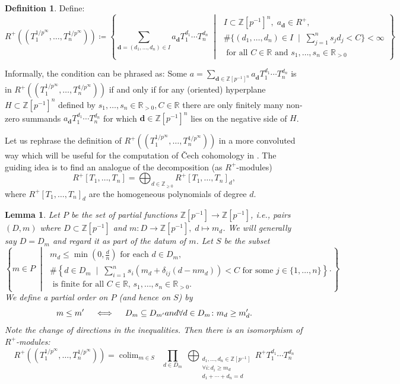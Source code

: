 \documentclass[10pt,twoside]{article}
\numberwithin{equation}{section}
\theoremstyle{plain}
\newtheorem{mylemma}[mythm]{Lemma}
\theoremstyle{definition}
\newtheorem{mydef}[mythm]{Definition}
\DeclareMathOperator*{\colim}{colim}
\newcommand{\ZZ}{\mathbb{Z}}
\newcommand{\RR}{\mathbb{R}}
\newcommand{\Cech}{\v{C}ech }
\newcommand{\pRoots}{{1/p^\infty}}
\newcommand{\ZZip}{\ZZ[p^{-1}]}
\newcommand{\ZZgez}{\ZZ_{\geq 0}}
\begin{document}
\begin{mydef}\cite[Definition 2.4]{Kim}\label{KimExtLaurentDef}
    Define:
    \[R^+((T_1^{\pRoots},\dots, T_n^{\pRoots}))\coloneqq
    \left\{
    \sum_{\mathbf{d}=(d_1,\dots,d_n)\in I}a_{\mathbf{d}}^{}T_1^{d_1}\cdots T_n^{d_n}
    \;\middle|\;
    \substack{I\subset \ZZ[p^{-1}]^n, \; a_{\mathbf{d}}\in R^+, \\
    \#\{(d_1,\dots,d_n)\in I \;\mid\; \sum_{j=1}^n s_jd_j<C\}<\infty \\
    \text{  for all \(C\in \RR\) and \(s_1,\dots,s_n\in \RR_{>0}\)}
    }
    \right\}\]
\end{mydef}
Informally, the condition can be phrased as: Some \(a=\sum_{\mathbf{d}\in \ZZip^n}a_{\mathbf{d}}^{}T_1^{d_1}\cdots T_n^{d_n}\) is in \(R^+((T_1^{\pRoots},\dots, T_n^{\pRoots}))\) if and only if for any (oriented)
hyperplane \(H\subset \ZZip^n\) defined by \(s_1,\dots,s_n\in \RR_{>0},C\in \RR\) there are only finitely many non-zero summands \(a_{\mathbf{d}}^{}T_1^{d_1}\cdots T_n^{d_n}\) for which \(\mathbf d\in \ZZip^n\) lies on the negative side of \(H\).\par

Let us rephrase the definition of \(R^+((T_1^{\pRoots},\dots,T_n^{\pRoots}))\) in a more convoluted way which will be useful for the computation of \Cech cohomology in . The guiding idea is to find an analogue of the decomposition (as \(R^+\)-modules) 
\[R^+[T_1,\dots,T_n]=\bigoplus_{d\in \ZZgez} R^+[T_1,\dots,T_n]_d,\]
where \(R^+[T_1,\dots,T_n]_d\) are the homogeneous polynomials of degree \(d\).

\begin{mylemma}\label{KimExtLaurentLemma}
    Let \(P\) be the set of partial functions \(\ZZip\to \ZZip\), i.e., pairs \((D,m)\) where \(D\subset \ZZip\) and \(m\colon D\to \ZZip, \; d\mapsto m_d\). We will generally say \(D=D_m\) and regard it as part of the datum of \(m\). Let \(S\) be the subset
    \[\left\{m\in P
    \;\middle|\;\substack{m_d\leq \min(0, \frac dn ) \text{ for each \(d\in D_m\)},\\
    \#\left\{d\in D_m \;\mid\;  \sum_{i=1}^n s_i\left(m_d + \delta_{ij}(d-nm_d)\right)<C \text{ for some } j\in \{1,\dots,n\}\right\} \\
    \text{ is finite for all \(C\in \RR\), \(s_1,\dots,s_n\in \RR_{>0}.\)}
    }
    \right\}.\]
    We define a partial order on \(P\) (and hence on \(S\)) by 
    \[m\leq m' \quad \iff \quad D_m\subseteq D_{m'} \emph{ and } \forall d\in D_m\colon m_d\geq m_d'.\]
    Note the change of directions in the inequalities. Then there is an isomorphism of \(R^+\)-modules:
    \[R^+((T_1^{\pRoots},\dots, T_n^{\pRoots}))=\colim_{m\in S} \;\;\prod_{d\in D_m}
    \;\bigoplus_{\substack{d_1,\dots,d_n\in \ZZ[p^{-1}]\\
    \forall i : d_i\geq m_d\\
    d_1+\cdots+d_n=d}}
    R^+ T_1^{d_1}\cdots T_n^{d_n}\]
\end{mylemma}
\end{document}
